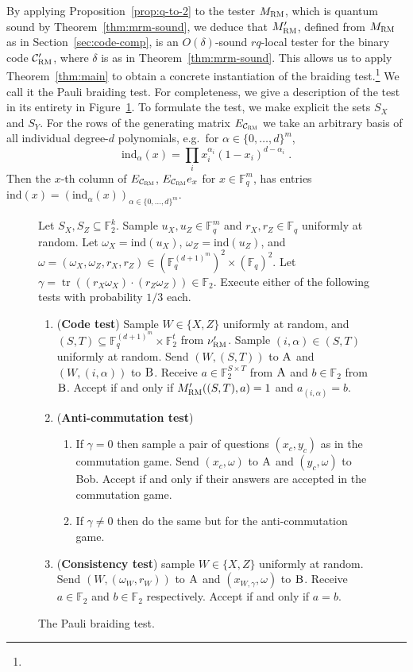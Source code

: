 \documentclass[11pt]{article}
\theoremstyle{definition}
\newcommand{\code}{\mathcal{C}}
\newcommand{\field}{\mathbb{F}_2}
\newcommand{\F}{\ensuremath{\mathbb{F}}}
\newcommand{\RM}{\ensuremath{\textsc{RM}}}
\newcommand{\ind}{\ensuremath{\mathrm{ind}}}
\DeclareMathOperator{\tr}{tr}
\newcommand{\labelstyle}[1]{\ensuremath{\textsc{#1}}\xspace}
\newcommand{\alice}{\labelstyle{A}}
\newcommand{\bob}{\labelstyle{B}}
\newenvironment{gamespec}{
  \begin{mdframed}[style=figstyle]}{
  \end{mdframed}}
\begin{document}
By applying Proposition~\ref{prop:q-to-2} to the tester $M_\RM$, which is quantum sound by Theorem~\ref{thm:mrm-sound}, we deduce that $M'_\RM$, defined from $M_\RM$ as in Section~\ref{sec:code-comp}, is an $O(\delta)$-sound $rq$-local tester for the binary code $\code'_{\RM}$, where $\delta$ is as in Theorem~\ref{thm:mrm-sound}. This allows us to apply Theorem~\ref{thm:main} to obtain a concrete instantiation of the braiding test.\footnote{} We call it the Pauli braiding test. For completeness, we give a description of the test in its entirety in Figure~\ref{fig:pauli-braiding}. To formulate the test, we make explicit the sets $S_X$ and $S_Y$. For the rows of the generating matrix $E_{\code_\RM}$ we take an arbitrary basis of all individual degree-$d$ polynomials, e.g.\ for $\alpha \in \{0,\ldots,d\}^m$, 
\[ \ind_{\alpha}(x) = \prod_{i} x_i^{\alpha_i} (1-x_i)^{d-\alpha_i}\;.\]
Then the $x$-th column of $E_{\code_\RM}$, $E_{\code_{\RM}}e_x$ for $x\in \F_q^m$, has entries $\ind(x)=(\ind_{\alpha}(x))_{\alpha\in\{0,\ldots,d\}^m}$.

\begin{figure}[!htbp]
  \centering
  \begin{gamespec}
Let $S_X,S_Z\subseteq \field^k$.  Sample $u_X,u_Z \in \F_q^m$ and $r_X,r_Z\in \F_q$ uniformly at random. Let $\omega_X = \ind(u_X)$, $\omega_Z=\ind(u_Z)$, and  $\omega = (\omega_X,\omega_Z,r_X,r_Z)\in (\F_q^{(d+1)^m})^2 \times (\F_q)^2$. Let 
$\gamma = \tr((r_X\omega_X) \cdot (r_Z\omega_Z)) \in \F_2$.
 Execute either of the following tests with probability $1/3$ each. 
\begin{enumerate}
      \setlength\itemsep{1pt}
    \item (\textbf{Code test}) Sample $W\in \{X,Z\}$ uniformly at random, and $(S,T)\subseteq \F_q^{(d+1)^m} \times \F_2^t$ from $\nu'_\RM$. Sample $(i,\alpha)\in (S,T)$ uniformly at random. Send $(W,(S,T))$ to $\alice$ and $(W,(i,\alpha))$ to $\bob$. Receive $a\in \F_2^{S\times T}$ from $\alice$ and $b\in \F_2$ from $\bob$. Accept if and only if $M'_\RM((S,T),a)=1$ and $a_{(i,\alpha)} = b$.  
    \item (\textbf{Anti-commutation test}) 
		\begin{enumerate}
		\item If $\gamma=0$ then sample a pair of questions $(x_c,y_c)$ as in the commutation game. Send $(x_c,\omega)$ to $\alice$ and $(y_c,\omega)$ to Bob. Accept if and only if their answers are accepted in the commutation game. 
		\item If $\gamma\neq 0$ then do the same but for the anti-commutation game. 
		\end{enumerate} 
		 \item (\textbf{Consistency test}) sample $W\in \{X,Z\}$ uniformly at random. Send $(W,(\omega_W,r_W))$ to $\alice$ and $(x_{W,\gamma},\omega)$ to $\bob$. Receive $a\in \F_2$ and $b\in \F_2$ respectively. Accept if and only if $a=b$. 
    \end{enumerate}
  \end{gamespec}
  \caption{The Pauli braiding test.}
  \label{fig:pauli-braiding}
\end{figure}
\end{document}
